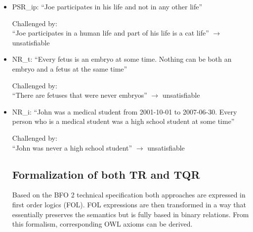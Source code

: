\begin{itemize}
\item PSR\_ip: ``Joe participates in his life and not in any other life''

Challenged by: \\``Joe participates in a human life and part of his life is a cat life''  $\rightarrow$ unsatisfiable




\item NR\_t: ``Every fetus is an embryo at some time. Nothing can be both an embryo and a fetus at the same time''

Challenged by: \\ ``There are fetuses that were never embryos''  $\rightarrow$ unsatisfiable


\item NR\_i: ``John was a medical student from 2001-10-01 to 2007-06-30. Every person who is a medical student was a high school student at some time''

Challenged by: \\ ``John was never a high school student''
 $\rightarrow$ unsatisfiable

 
%
%
%
%

\subsection*{Formalization of both TR and TQR}
Based on the BFO 2 technical specification \cite{BFO2:ref} both approaches are expressed in first order logics (FOL). FOL expressions are then 
transformed in a way that essentially preserves the semantics but is fully based in binary relations. From this formalism, corresponding 
OWL axioms can be derived.  


\end{itemize}
